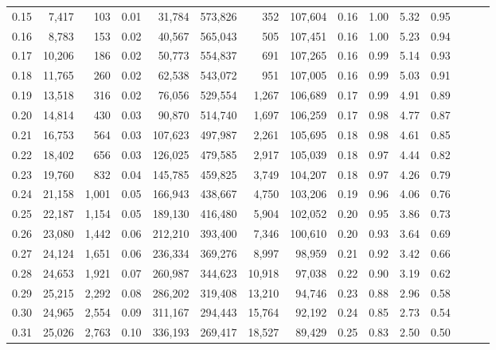 \begin{tabular}{rrrrrrrrrrrrrrr}
0.15 &   7,417 &    103 &  0.01 &   31,784 &  573,826 &      352 &  107,604 &  0.16 &  1.00 &  5.32 &      0.95 \\
0.16 &   8,783 &    153 &  0.02 &   40,567 &  565,043 &      505 &  107,451 &  0.16 &  1.00 &  5.23 &      0.94 \\
0.17 &  10,206 &    186 &  0.02 &   50,773 &  554,837 &      691 &  107,265 &  0.16 &  0.99 &  5.14 &      0.93 \\
0.18 &  11,765 &    260 &  0.02 &   62,538 &  543,072 &      951 &  107,005 &  0.16 &  0.99 &  5.03 &      0.91 \\
0.19 &  13,518 &    316 &  0.02 &   76,056 &  529,554 &    1,267 &  106,689 &  0.17 &  0.99 &  4.91 &      0.89 \\
0.20 &  14,814 &    430 &  0.03 &   90,870 &  514,740 &    1,697 &  106,259 &  0.17 &  0.98 &  4.77 &      0.87 \\
0.21 &  16,753 &    564 &  0.03 &  107,623 &  497,987 &    2,261 &  105,695 &  0.18 &  0.98 &  4.61 &      0.85 \\
0.22 &  18,402 &    656 &  0.03 &  126,025 &  479,585 &    2,917 &  105,039 &  0.18 &  0.97 &  4.44 &      0.82 \\
0.23 &  19,760 &    832 &  0.04 &  145,785 &  459,825 &    3,749 &  104,207 &  0.18 &  0.97 &  4.26 &      0.79 \\
0.24 &  21,158 &  1,001 &  0.05 &  166,943 &  438,667 &    4,750 &  103,206 &  0.19 &  0.96 &  4.06 &      0.76 \\
0.25 &  22,187 &  1,154 &  0.05 &  189,130 &  416,480 &    5,904 &  102,052 &  0.20 &  0.95 &  3.86 &      0.73 \\
0.26 &  23,080 &  1,442 &  0.06 &  212,210 &  393,400 &    7,346 &  100,610 &  0.20 &  0.93 &  3.64 &      0.69 \\
0.27 &  24,124 &  1,651 &  0.06 &  236,334 &  369,276 &    8,997 &   98,959 &  0.21 &  0.92 &  3.42 &      0.66 \\
0.28 &  24,653 &  1,921 &  0.07 &  260,987 &  344,623 &   10,918 &   97,038 &  0.22 &  0.90 &  3.19 &      0.62 \\
0.29 &  25,215 &  2,292 &  0.08 &  286,202 &  319,408 &   13,210 &   94,746 &  0.23 &  0.88 &  2.96 &      0.58 \\
0.30 &  24,965 &  2,554 &  0.09 &  311,167 &  294,443 &   15,764 &   92,192 &  0.24 &  0.85 &  2.73 &      0.54 \\
0.31 &  25,026 &  2,763 &  0.10 &  336,193 &  269,417 &   18,527 &   89,429 &  0.25 &  0.83 &  2.50 &      0.50 \\

\end{tabular}
